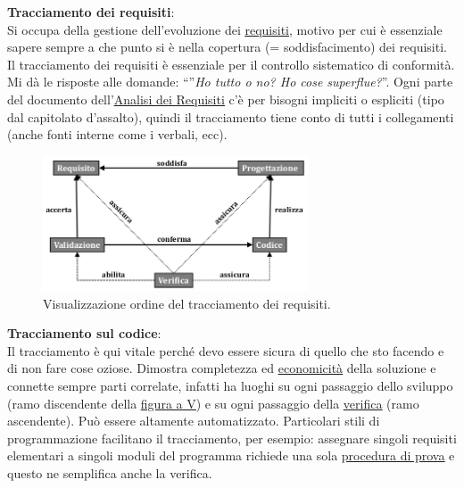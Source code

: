 		\textbf{Tracciamento dei requisiti}: \\
		Si occupa della gestione dell'evoluzione dei \underline{\hyperref[requirements]{requisiti}}, motivo per cui è essenziale sapere sempre a che punto si è nella copertura (= soddisfacimento) dei requisiti.
		Il tracciamento dei requisiti è essenziale per il controllo sistematico di conformità.
		Mi dà le risposte alle domande: ``''\textit{Ho tutto o no? Ho cose superflue?}''. Ogni parte del documento dell'\underline{\hyperref[analisideirequisiti]{Analisi dei Requisiti}} c'è per bisogni impliciti o espliciti (tipo dal capitolato d'assalto), quindi il tracciamento tiene conto di tutti i collegamenti (anche fonti interne come i verbali, ecc).

		\begin{figure}[H]
			\centering
			\includegraphics[width=0.7\textwidth]{img/trac}
			\caption{Visualizzazione ordine del tracciamento dei requisiti.}
		\end{figure}

		\textbf{Tracciamento sul codice}: \\ %
		Il tracciamento è qui vitale perché devo essere sicura di quello che sto facendo e di non fare cose oziose.
		Dimostra completezza ed \underline{\hyperref[economicita]{economicità}} della soluzione e connette sempre parti correlate, infatti ha luoghi su ogni passaggio dello sviluppo (ramo discendente della \underline{\hyperref[V]{figura a V}}) e su ogni passaggio della \underline{\hyperref[verificare]{verifica}} (ramo ascendente).
		Può essere altamente automatizzato.
		Particolari stili di programmazione facilitano il tracciamento, per esempio: assegnare singoli requisiti elementari a singoli moduli del programma richiede una sola \underline{\hyperref[prova]{procedura di prova}} e questo ne semplifica anche la verifica.
